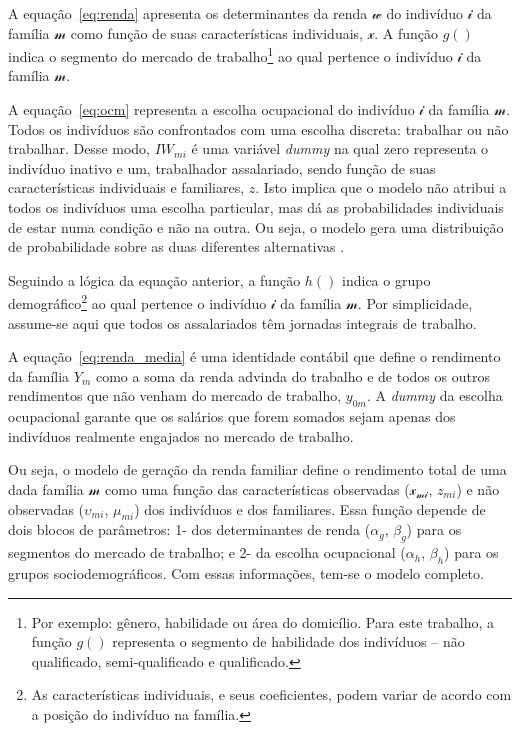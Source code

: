 A equação~\eqref{eq:renda} apresenta os determinantes da renda $\mathcal{w}$ do indivíduo $\mathcal{i}$ da família $\mathcal{m}$ como função de suas características individuais, $\mathcal{x}$. A função $g()$ indica o segmento do mercado de trabalho\footnote{Por exemplo: gênero, habilidade ou área do domicílio. Para este trabalho, a função $g()$ representa o segmento de habilidade dos indivíduos -- não qualificado, semi-qualificado e qualificado.} ao qual pertence o indivíduo $\mathcal{i}$ da família $\mathcal{m}$.

A equação~\eqref{eq:ocm} representa a escolha ocupacional do indivíduo $\mathcal{i}$ da família $\mathcal{m}$. Todos os indivíduos são confrontados com uma escolha discreta: trabalhar ou não trabalhar. Desse modo, $IW_{mi}$ é uma variável \textit{dummy} na qual zero representa o indivíduo inativo e um, trabalhador assalariado, sendo função de suas características individuais e familiares, $z$. Isto implica que o modelo não atribui a todos os indivíduos uma escolha particular, mas dá as probabilidades individuais de estar numa condição e não na outra. Ou seja, o modelo gera uma distribuição de probabilidade sobre as duas diferentes alternativas \cite{colombo08}.

Seguindo a lógica da equação anterior, a função $h()$ indica o grupo demográfico\footnote{As características individuais, e seus coeficientes, podem variar de acordo com a posição do indivíduo na família.} ao qual pertence o indivíduo $\mathcal{i}$ da família $\mathcal{m}$. Por simplicidade, assume-se aqui que todos os assalariados têm jornadas integrais de trabalho.

A equação~\eqref{eq:renda_media} é uma identidade contábil que define o rendimento da família $Y_m$ como a soma da renda advinda do trabalho e de todos os outros rendimentos que não venham do mercado de trabalho, $y_{0m}$. A \textit{dummy} da escolha ocupacional garante que os salários que forem somados sejam apenas dos indivíduos realmente engajados no mercado de trabalho.

Ou seja, o modelo de geração da renda familiar define o rendimento total de uma dada família $\mathcal{m}$ como uma função das características observadas ($\mathcal{x_{mi}}$, $z_{mi}$) e não observadas ($\upsilon_{mi}$, $\mu_{mi}$) dos indivíduos e dos familiares. Essa função depende de dois blocos de parâmetros: 1- dos determinantes de renda ($\alpha_g$, $\beta_g$) para os segmentos do mercado de trabalho; e 2- da escolha ocupacional ($\alpha_h$, $\beta_h$) para os grupos sociodemográficos. Com essas informações, tem-se o modelo completo.


